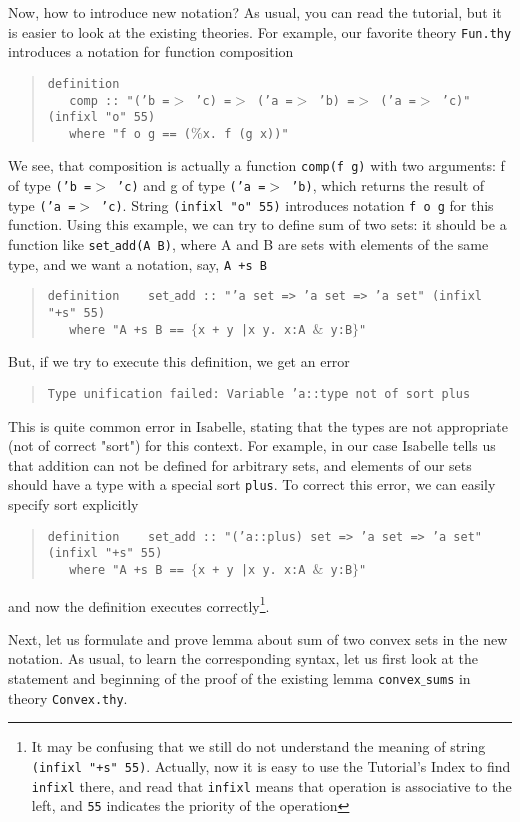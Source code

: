 \documentclass[11pt]{article}
\newcommand{\inds}{\phantom{a}\,\,\,}
\newcommand{\prog}[1]{\par\noindent\begin{quote}#1\end{quote}\par\noindent}
\begin{document}
Now, how to introduce new notation? As usual, you can read the tutorial, but it is easier to look at the existing theories. For example, our favorite theory {\tt Fun.thy} introduces a notation for function composition

\prog{\tt definition\\
    \inds comp :: "('b =$>$ 'c) =$>$ ('a =$>$ 'b) =$>$ ('a =$>$ 'c)" (infixl "o" 55)\\
    \inds where "f o g == ($\%$x. f (g x))"}

We see, that composition is actually a function {\tt comp(f g)} with two arguments: f of type {\tt ('b =$>$ 'c)} and g of type {\tt ('a =$>$ 'b)}, which returns the result of type {\tt ('a =$>$ 'c)}. String {\tt (infixl "o" 55)} introduces notation {\tt f o g} for this function. Using this example, we can try to define sum of two sets: it should be a function like {\tt set$\_$add(A B)}, where A and B are sets with elements of the same type, and we want a notation, say, {\tt A +s B}

\prog{\tt definition
    \inds set$\_$add :: "'a set => 'a set => 'a set"  (infixl "+s" 55)\\
    \inds where "A +s B == $\{$x + y |x y.~x:A $\&$ y:B$\}$"}%

But, if we try to execute this definition, we get an error

\prog{\tt Type unification failed: Variable 'a::type not of sort plus }

This is quite common error in Isabelle, stating that the types are not appropriate (not of correct "sort") for this context. For example, in our case Isabelle tells us that addition can not be defined for arbitrary sets, and elements of our sets should have a type with a special sort {\tt plus}. To correct this error, we can easily specify sort explicitly

\prog{\tt definition
    \inds set$\_$add :: "('a::plus) set => 'a set => 'a set"  (infixl "+s" 55)\\
    \inds where "A +s B == $\{$x + y |x y. x:A $\&$ y:B$\}$"}%
and now the definition executes correctly\footnote{It may be confusing that we still do not understand the meaning of string {\tt (infixl "+s" 55)}. Actually, now it is easy to use the Tutorial's Index to find {\tt infixl} there, and read that {\tt infixl} means that operation is associative to the left, and {\tt 55} indicates the priority of the operation}.

Next, let us formulate and prove lemma about sum of two convex sets in the new notation. As usual, to learn the corresponding syntax, let us first look at the statement and beginning of the proof of the existing lemma {\tt convex$\_$sums} in theory {\tt Convex.thy}.
\end{document}
